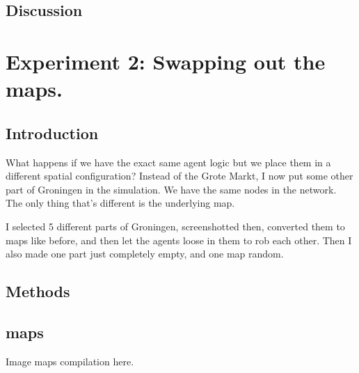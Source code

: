 \subsection{Discussion}

\section{Experiment 2: Swapping out the maps.}
\subsection{Introduction}
What happens if we have the exact same agent logic but we place them in a different spatial configuration? Instead of the Grote Markt, I now put some other part of Groningen in the simulation. We have the same nodes in the network. The only thing that's different is the underlying map.

I selected 5 different parts of Groningen, screenshotted then, converted them to maps like before, and then let the agents loose in them to rob each other.  Then I also made one part just completely empty, and one map random.

\subsection{Methods}

\subsection{maps}
Image maps compilation here.

